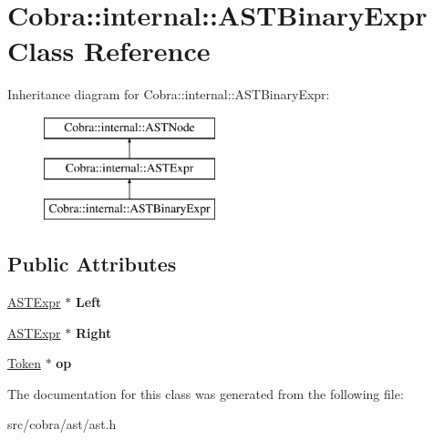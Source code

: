 \hypertarget{class_cobra_1_1internal_1_1_a_s_t_binary_expr}{\section{Cobra\+:\+:internal\+:\+:A\+S\+T\+Binary\+Expr Class Reference}
\label{class_cobra_1_1internal_1_1_a_s_t_binary_expr}
}
Inheritance diagram for Cobra\+:\+:internal\+:\+:A\+S\+T\+Binary\+Expr\+:\begin{figure}[H]
\begin{center}
\leavevmode
\includegraphics[height=3.000000cm]{class_cobra_1_1internal_1_1_a_s_t_binary_expr}
\end{center}
\end{figure}
\subsection*{Public Attributes}
\begin{DoxyCompactItemize}
\item 
\hypertarget{class_cobra_1_1internal_1_1_a_s_t_binary_expr_aeb1680fce98d2d2b17bf4d8751efea4d}{\hyperlink{class_cobra_1_1internal_1_1_a_s_t_expr}{A\+S\+T\+Expr} $\ast$ {\bfseries Left}}\label{class_cobra_1_1internal_1_1_a_s_t_binary_expr_aeb1680fce98d2d2b17bf4d8751efea4d}

\item 
\hypertarget{class_cobra_1_1internal_1_1_a_s_t_binary_expr_a7b1c52a1e71454681f675401344ea4c9}{\hyperlink{class_cobra_1_1internal_1_1_a_s_t_expr}{A\+S\+T\+Expr} $\ast$ {\bfseries Right}}\label{class_cobra_1_1internal_1_1_a_s_t_binary_expr_a7b1c52a1e71454681f675401344ea4c9}

\item 
\hypertarget{class_cobra_1_1internal_1_1_a_s_t_binary_expr_aa94555a0468455f9ad2d5a7f848d1ef9}{\hyperlink{class_cobra_1_1internal_1_1_token}{Token} $\ast$ {\bfseries op}}\label{class_cobra_1_1internal_1_1_a_s_t_binary_expr_aa94555a0468455f9ad2d5a7f848d1ef9}

\end{DoxyCompactItemize}


The documentation for this class was generated from the following file\+:\begin{DoxyCompactItemize}
\item 
src/cobra/ast/ast.\+h\end{DoxyCompactItemize}
